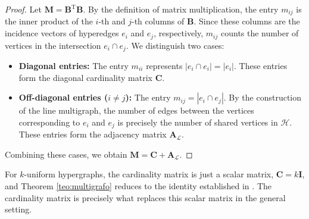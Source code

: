 \documentclass[12pt,reqno]{amsart}
\begin{document}
\begin{proof}
Let $\mathbf{M} = \mathbf{B}^\mathrm{T}\mathbf{B}$. By the definition of matrix multiplication, the entry $m_{ij}$ is the inner product of the $i$-th and $j$-th columns of $\mathbf{B}$. Since these columns are the incidence vectors of hyperedges $e_i$ and $e_j$, respectively, $m_{ij}$ counts the number of vertices in the intersection $e_i \cap e_j$. We distinguish two cases:
\begin{itemize}
\item \textbf{Diagonal entries:} The entry $m_{ii}$ represents $|e_i \cap e_i| = |e_i|$. These entries form the diagonal cardinality matrix $\mathbf{C}$.

\item \textbf{Off-diagonal entries ($i \neq j$):} The entry $m_{ij} = |e_i \cap e_j|$. By the construction of the line multigraph, the number of edges between the vertices corresponding to $e_i$ and $e_j$ is precisely the number of shared vertices in $\mathcal{H}$. These entries form the adjacency matrix $\mathbf{A}_{\mathcal{L}}$.
\end{itemize}
Combining these cases, we obtain $\mathbf{M} = \mathbf{C} + \mathbf{A}_{\mathcal{L}}$.
\end{proof}

For $k$-uniform hypergraphs, the cardinality matrix is just a scalar matrix, $\mathbf{C} = k\mathbf{I}$, and Theorem \ref{teo:multigrafo} reduces to the identity established in \cite{kaue-lap}. The cardinality matrix is precisely what replaces this scalar matrix in the general setting.
\end{document}
